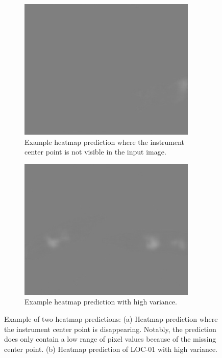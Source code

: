 \begin{figure}
\centering
\begin{subfigure}[t]{0.49\textwidth}
\centering
\includegraphics[width=.7\textwidth]{images/predictions/model1/nearly_vanished_instr/frame308_nearly_disappeared.jpg}
\caption{Example heatmap prediction where the instrument center point is not visible in the input image.}
\label{img:nearly_disappeared_instr}
\end{subfigure}
\begin{subfigure}[t]{0.49\textwidth}
\centering
\includegraphics[width=.7\textwidth]{images/predictions/model3/Dataset1-high_variance/frame037_heatmap_high_variance.jpg}
\caption{Example heatmap prediction with high variance.}
\label{img:pred_heatmap_high_variance}
\end{subfigure}
\caption[Example heatmap prediction high variance, example heatmap prediction disappearing center point]{Example of two heatmap predictions: (a) Heatmap prediction where the instrument center point is disappearing. Notably, the prediction does only contain a low range of pixel values because of the missing center point. (b) Heatmap prediction of LOC-01 with high variance.}
\label{img:high+low_variance_heatmaps}
\end{figure}

